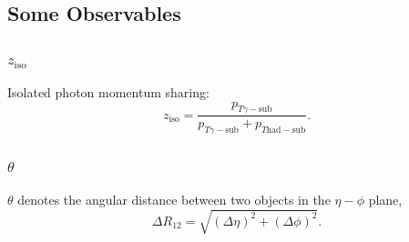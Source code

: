 \documentclass[9pt, mathserif]{beamer}
\begin{document}
        \subsection{Some Observables}
            \begin{frame}
                \frametitle{$z_{\mathrm{iso}}$}
                Isolated photon momentum sharing:
                \begin{equation}
                    z_{\mathrm{iso}}=\frac{p_{T\gamma-\mathrm{sub}}}{p_{T\gamma-\mathrm{sub}}+p_{T\mathrm{had}-\mathrm{sub}}}.
                \end{equation}
            \end{frame}
            \begin{frame}
                \frametitle{$\theta$}
                $\theta$ denotes the angular distance between two objects in the $\eta-\phi$ plane,
                \begin{equation}
                    \Delta R_{12}=\sqrt{(\Delta \eta)^2+(\Delta \phi)^2}.
                \end{equation}
            \end{frame}
\end{document}
